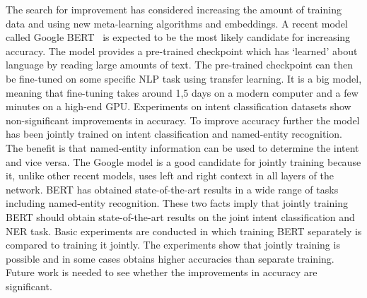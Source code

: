 The search for improvement has considered increasing the amount of training data and using new meta-learning algorithms and embeddings.
A recent model called Google BERT~\citep{devlin2018} is expected to be the most likely candidate for increasing accuracy.
The model provides a pre-trained checkpoint which has `learned' about language by reading large amounts of text.
The pre-trained checkpoint can then be fine-tuned on some specific NLP task using transfer learning.
It is a big model, meaning that fine-tuning takes around 1,5 days on a modern computer and a few minutes on a high-end GPU.
Experiments on intent classification datasets show non-significant improvements in accuracy.
To improve accuracy further the model has been jointly trained on intent classification and named-entity recognition.
The benefit is that named-entity information can be used to determine the intent and vice versa.
The Google model is a good candidate for jointly training because it, unlike other recent models, uses left and right context in all layers of the network.
BERT has obtained state-of-the-art results in a wide range of tasks including named-entity recognition.
These two facts imply that jointly training BERT should obtain state-of-the-art results on the joint intent classification and NER task.
Basic experiments are conducted in which training BERT separately is compared to training it jointly.
The experiments show that jointly training is possible and in some cases obtains higher accuracies than separate training.
Future work is needed to see whether the improvements in accuracy are significant.

\iffalse
In general the NLP field is in an interesting state.
Technology companies have a lot of incentive to push the field forward.
Leaps in the last few years have come from those companies.
For example, FastText by Facebook and transformer models by Google.
A second observation is that state-of-the-art scores are increased every few months.
This results in papers which are quickly pushed to arXiv and cited before any scholarly peer review.
Papers report accuracy high scores with ``few mentions of average cases and variability or worst-cases''~\citep{otter2018survey}.

A recent review paper for deep learning and NLP~\citep{young2018recent} still see lots of potential.
They expect better models for unlabelled data, reinforcement learning, zero-shot learning and network memory enrichment via a knowledge base.

\fi

